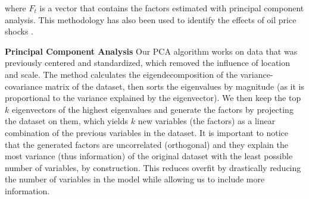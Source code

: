 \documentclass[11pt,a4paper]{article}
\begin{document}
\noindent
where $F_t$ is a vector that contains the factors estimated with principal component analysis. 
This methodology has also been used to identify the effects of oil price shocks \citep{aastveit2014oil, aastveit2015drives}. 

\vspace{1em}
\noindent\textbf{Principal Component Analysis} Our PCA algorithm works on data that was previously centered and standardized, which removed the influence of location and scale. \newline
The method calculates the eigendecomposition of the variance-covariance matrix of the dataset, then sorts the eigenvalues by magnitude (as it is proportional to the variance explained by the eigenvector). We then keep the top $k$ eigenvectors of the highest eigenvalues and generate the factors by projecting the dataset on them, which yields $k$ new variables (the factors) as a linear combination of the previous variables in the dataset. \newline
It is important to notice that the generated factors are uncorrelated (orthogonal) and they explain the most variance (thus information) of the original dataset with the least possible number of variables, by construction. This reduces overfit by drastically reducing the number of variables in the model while allowing us to include more information. 
\end{document}
